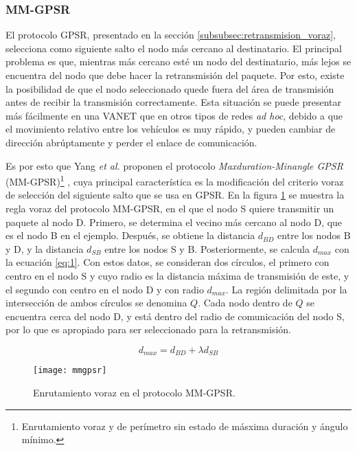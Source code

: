 \subsubsection{MM-GPSR}

\label{subsubsec:mm_gpsr}

El protocolo GPSR, presentado en la sección \ref{subsubsec:retransmision_voraz},
selecciona como siguiente salto el nodo más cercano al destinatario. El
principal problema es que, mientras más cercano esté un nodo del destinatario,
más lejos se encuentra del nodo que debe hacer la retransmisión del paquete.
Por esto, existe la posibilidad de que el nodo seleccionado quede fuera del área
de transmisión antes de recibir la transmisión correctamente. Esta situación se
puede presentar más fácilmente en una VANET que en otros tipos de redes
\textit{ad hoc}, debido a que el movimiento relativo entre los vehículos es muy
rápido, y pueden cambiar de dirección abrúptamente y perder el enlace de
comunicación.

Es por esto que Yang \textit{et al.} proponen el protocolo
\textit{Maxduration-Minangle GPSR} (MM-GPSR)\footnote{Enrutamiento voraz y de
perímetro sin estado de másxima duración y ángulo mínimo.} \cite{Yang2018},
cuya principal característica es la modificación del criterio voraz de
selección del siguiente salto que se usa en GPSR. En la figura \ref{fig:mmgpsr}
se muestra la regla voraz del protocolo MM-GPSR, en el que el nodo S quiere
transmitir un paquete al nodo D. Primero, se determina el vecino más cercano al
nodo D, que es el nodo B en el ejemplo. Después, se obtiene la distancia
$d_{BD}$ entre los nodos B y D, y la distancia $d_{SB}$ entre los nodos S y B.
Posteriormente, se calcula $d_{max}$ con la ecuación \ref{eq:1}. Con estos
datos, se consideran dos círculos, el primero con centro en el nodo S y cuyo
radio es la distancia máxima de transmisión de este, y el segundo con centro en
el nodo D y con radio $d_{max}$. La región delimitada por la intersección de
ambos círculos se denomina $Q$. Cada nodo dentro de $Q$ se encuentra cerca del
nodo D, y está dentro del radio de comunicación del nodo S, por lo que es
apropiado para ser seleccionado para la retransmisión.

\begin{equation}
\label{eq:1}
d_{max} = d_{BD} + \lambda d_{SB}
\end{equation}

\begin{figure}[th]
\centering
\texttt{[image: mmgpsr]}
\decoRule
\caption[Enrutamiento voraz en el protocolo MM-GPSR]{Enrutamiento voraz en el
protocolo MM-GPSR\protect\footnotemark.}
\label{fig:mmgpsr}
\end{figure}


